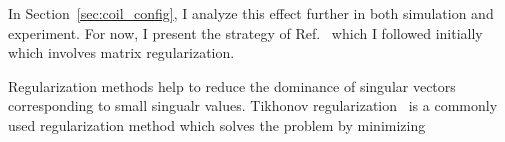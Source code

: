 



In Section~\ref{sec:coil_config}, I analyze this effect further in both simulation and experiment. For now, I present the strategy of Ref.~\cite{bea} which I followed initially which involves matrix regularization.

Regularization methods help to reduce the dominance of singular vectors corresponding to small singualr values. Tikhonov regularization~\cite{tikhonov2013numerical,tikhonov_book,svd,svd3} is a commonly used regularization method which solves the problem by minimizing 

